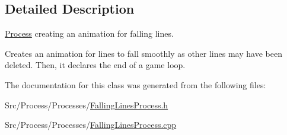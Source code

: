 \subsection{Detailed Description}
\hyperlink{classProcess}{Process} creating an animation for falling lines. 

Creates an animation for lines to fall smoothly as other lines may have been deleted. Then, it declares the end of a game loop. 

The documentation for this class was generated from the following files\-:\begin{DoxyCompactItemize}
\item 
Src/\-Process/\-Processes/\hyperlink{FallingLinesProcess_8h}{Falling\-Lines\-Process.\-h}\item 
Src/\-Process/\-Processes/\hyperlink{FallingLinesProcess_8cpp}{Falling\-Lines\-Process.\-cpp}\end{DoxyCompactItemize}
